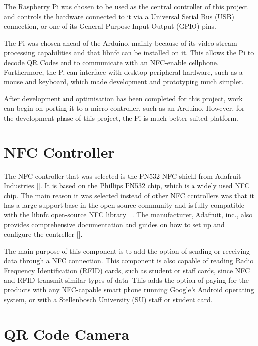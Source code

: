 The Raspberry Pi was chosen to be used as the central controller of this project and
controls the hardware connected to it via a Universal Serial Bus (USB) connection, or one of
its General Purpose Input Output (GPIO) pins.

The Pi was chosen ahead of the Arduino, mainly because of its video stream processing capabilities 
and that libnfc can be installed on it. This allows the Pi to decode QR Codes and to communicate with 
an NFC-enable cellphone. Furthermore, the Pi can interface with desktop peripheral hardware, such as a mouse and
keyboard, which made development and prototyping much simpler.

After development and optimisation has been completed for this project, work can begin on porting it to 
a micro-controller, such as an Arduino. However, for the development phase of this project,
 the Pi is much better suited platform.

\section{NFC Controller}
\label{sec:nfc-controller}

The NFC controller that was selected is the PN532 NFC shield from Adafruit Industries
[\cite{website:adafruit-nfc}]. It is based on
the Phillips PN532 chip, which is a widely used NFC chip. The main reason it was selected instead
of other NFC controllers was that it has a large support base in the open-source
community and is fully compatible with the libnfc open-source NFC library
[\cite{website:libnfc-hardware}]. The manufacturer, Adafruit, inc., also provides
comprehensive documentation and guides on how to set up and configure the controller
[\cite{website:adafruit-tutorial}].
 
The main purpose of this component is to add the option of sending or receiving data
through a NFC connection.
This component is also capable of reading Radio Frequency Identification (RFID)
cards, such as student or staff cards, since NFC and RFID transmit similar types of data. This adds the option of paying for the products with 
any NFC-capable smart phone running Google's Android operating system, or with a
Stellenbosch University (SU) staff or student card.

\section{QR Code Camera}
\label{sec:webcam}


